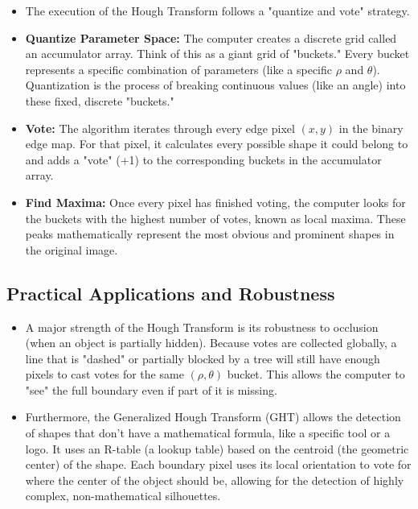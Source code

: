 \documentclass[12pt]{article}
\begin{document}
\begin{itemize}
    \item The execution of the Hough Transform follows a "quantize and vote" strategy.

    \item \textbf{Quantize Parameter Space:} The computer creates a discrete grid called an accumulator array. Think of this as a giant grid of "buckets." Every bucket represents a specific combination of parameters (like a specific $\rho$ and $\theta$). Quantization is the process of breaking continuous values (like an angle) into these fixed, discrete "buckets."

    \item \textbf{Vote:} The algorithm iterates through every edge pixel $(x,y)$ in the binary edge map. For that pixel, it calculates every possible shape it could belong to and adds a "vote" (+1) to the corresponding buckets in the accumulator array.

    \item \textbf{Find Maxima:} Once every pixel has finished voting, the computer looks for the buckets with the highest number of votes, known as local maxima. These peaks mathematically represent the most obvious and prominent shapes in the original image.
\end{itemize}

\subsection{Practical Applications and Robustness}

\begin{itemize}
    \item A major strength of the Hough Transform is its robustness to occlusion (when an object is partially hidden). Because votes are collected globally, a line that is "dashed" or partially blocked by a tree will still have enough pixels to cast votes for the same $(\rho,\theta)$ bucket. This allows the computer to "see" the full boundary even if part of it is missing.

    \item Furthermore, the Generalized Hough Transform (GHT) allows the detection of shapes that don't have a mathematical formula, like a specific tool or a logo. It uses an R-table (a lookup table) based on the centroid (the geometric center) of the shape. Each boundary pixel uses its local orientation to vote for where the center of the object should be, allowing for the detection of highly complex, non-mathematical silhouettes.
\end{itemize}
\end{document}
